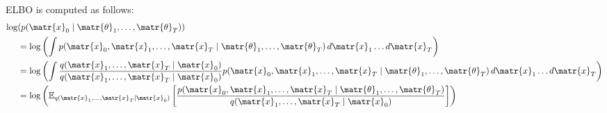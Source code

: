 \begin{description}
\begin{description}
\begin{description}
                        ELBO is computed as follows:
                        \[ 
                            \begin{split}
                                \log&(p(\matr{x}_0 \mid \matr{\theta}_1, \dots, \matr{\theta}_T)) \\ 
                                &= \log\left( \int p(\matr{x}_0, \matr{x}_1, \dots, \matr{x}_T \mid \matr{\theta}_1, \dots, \matr{\theta}_T) \, d\matr{x}_1 \dots d\matr{x}_T \right) \\
                                &= \log\left( \int \frac{q(\matr{x}_1, \dots, \matr{x}_T \mid \matr{x}_0)}{q(\matr{x}_1, \dots, \matr{x}_T \mid \matr{x}_0)} p(\matr{x}_0, \matr{x}_1, \dots, \matr{x}_T \mid \matr{\theta}_1, \dots, \matr{\theta}_T) \, d\matr{x}_1 \dots d\matr{x}_T \right) \\
                                &= \log\left( \mathbb{E}_{q(\matr{x}_1, \dots, \matr{x}_T \mid \matr{x}_0)}\left[ \frac{p(\matr{x}_0, \matr{x}_1, \dots, \matr{x}_T \mid \matr{\theta}_1, \dots, \matr{\theta}_T)}{q(\matr{x}_1, \dots, \matr{x}_T \mid \matr{x}_0)} \right] \right) \\
                            \end{split}
                        \]
                \end{description}
        \end{description}
\end{description}